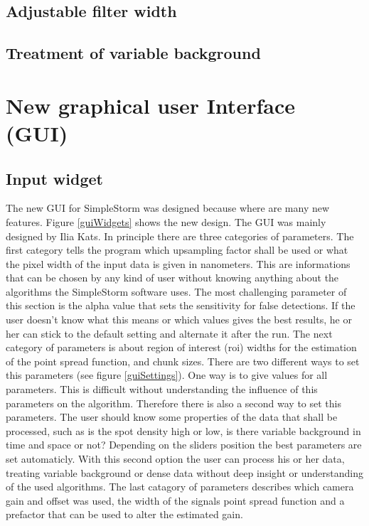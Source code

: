 \subsection{Adjustable filter width}
\subsection{Treatment of variable background}



\section{New graphical user Interface (GUI)}
\subsection{Input widget}
The new GUI for SimpleStorm was designed because where are many new features. Figure \ref{guiWidgets} shows the new design. The GUI was mainly designed by Ilia Kats.
In principle there are three categories of parameters. The first category tells the program which upsampling factor shall be used or what the pixel width of the input data is given in nanometers. This are informations that can be chosen by any kind of user without knowing anything about the algorithms  the SimpleStorm software uses. The most challenging parameter of this section is the alpha value that sets the sensitivity for false detections. If the user doesn't know what this means or which values gives the best results, he or her can stick to the default setting and alternate it after the run. \newline
The next category of parameters is about region of interest (roi) widths for the estimation of the point spread function, and chunk sizes. There are two different ways to set this parameters (see figure \ref{guiSettings}). One way is to give values for all parameters. This is difficult without understanding the influence of this parameters on the algorithm. Therefore there is also a second way to set this parameters. The user should know some properties of the data that shall be processed, such as is the spot density high or low, is there variable background in time and space or not? Depending on the sliders position the best parameters are set automaticly. With this second option the user can process his or her data, treating variable background or dense data without deep insight or understanding of the used algorithms.\newline
The last catagory of parameters describes which camera gain and offset was used, the width of the signals point spread function and a prefactor that can be used to alter the estimated gain. 
